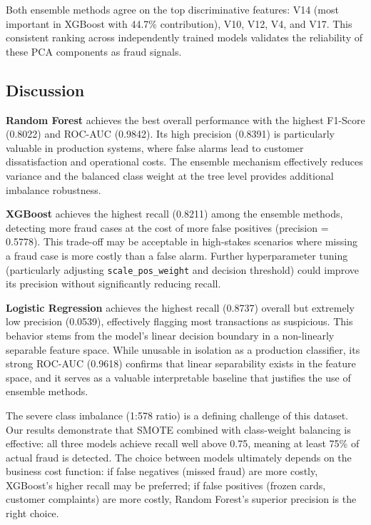 \documentclass[conference]{IEEEtran}
\begin{document}
Both ensemble methods agree on the top discriminative features: V14 (most important in XGBoost with 44.7\% contribution), V10, V12, V4, and V17. This consistent ranking across independently trained models validates the reliability of these PCA components as fraud signals.

\subsection{Discussion}

\textbf{Random Forest} achieves the best overall performance with the highest F1-Score (0.8022) and ROC-AUC (0.9842). Its high precision (0.8391) is particularly valuable in production systems, where false alarms lead to customer dissatisfaction and operational costs. The ensemble mechanism effectively reduces variance and the balanced class weight at the tree level provides additional imbalance robustness.

\textbf{XGBoost} achieves the highest recall (0.8211) among the ensemble methods, detecting more fraud cases at the cost of more false positives (precision = 0.5778). This trade-off may be acceptable in high-stakes scenarios where missing a fraud case is more costly than a false alarm. Further hyperparameter tuning (particularly adjusting \texttt{scale\_pos\_weight} and decision threshold) could improve its precision without significantly reducing recall.

\textbf{Logistic Regression} achieves the highest recall (0.8737) overall but extremely low precision (0.0539), effectively flagging most transactions as suspicious. This behavior stems from the model's linear decision boundary in a non-linearly separable feature space. While unusable in isolation as a production classifier, its strong ROC-AUC (0.9618) confirms that linear separability exists in the feature space, and it serves as a valuable interpretable baseline that justifies the use of ensemble methods.

The severe class imbalance (1:578 ratio) is a defining challenge of this dataset. Our results demonstrate that SMOTE combined with class-weight balancing is effective: all three models achieve recall well above 0.75, meaning at least 75\% of actual fraud is detected. The choice between models ultimately depends on the business cost function: if false negatives (missed fraud) are more costly, XGBoost's higher recall may be preferred; if false positives (frozen cards, customer complaints) are more costly, Random Forest's superior precision is the right choice.
\end{document}
